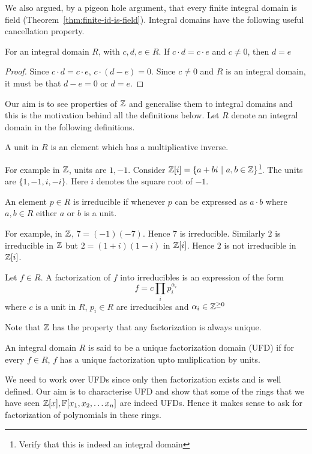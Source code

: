 We also argued, by a pigeon hole argument, that every finite integral domain is
field (Theorem~\ref{thm:finite-id-is-field}). Integral domains have the
following useful cancellation property.  
\begin{lemma} \label{lem:id-cancel}
	For an integral domain $R$, with $c,d,e \in R$. If 
	$c\cdot d = c\cdot e$ and $c \ne 0$, then $d=e$
\end{lemma}
\begin{proof}
	Since $c\cdot d = c \cdot e$, $c\cdot (d-e) = 0$. Since $c \ne 0$ and $R$ is
	an integral domain, it must be that $d-e = 0$ or $d=e$.
\end{proof}

Our aim is to see properties of ${\mathbb{Z}}$ and generalise them
to integral domains and this is the motivation behind all the definitions
below. Let $R$ denote an integral domain in the following
definitions.
\begin{definition}[Unit]
	A unit in $R$ is an element which has a multiplicative inverse.
\end{definition}
For example in ${\mathbb{Z}}$, units are $1,-1$. Consider ${\mathbb{Z}}[i] = \{a + bi ~|~ a,b \in
{\mathbb{Z}} \}$\footnote{Verify that this is indeed an integral domain}.  The units are
$\{1,-1,i,-i\}$. Here $i$ denotes the square root of $-1$.
\begin{definition}[Irreducible]
	An element $p \in R$ is irreducible if whenever $p$ can be expressed
	as $a \cdot b$ where $a,b \in R$ either $a$ or $b$ is a unit.
\end{definition}
For example, in ${\mathbb{Z}}$, $7 = (-1)(-7)$. Hence $7$ is irreducible. Similarly $2$
is irreducible in ${\mathbb{Z}}$ but $2 = (1+i)(1-i)$ in ${\mathbb{Z}}[i]$. Hence $2$ is not
irreducible in ${\mathbb{Z}}[i]$.

\begin{definition}[Factorization]
	Let $f \in R$. A factorization of $f$ into irreducibles is an
	expression of the form \[ f = c\prod_i p_i^{\alpha_i}\] where $c$ is a
	unit in $R$, $p_i \in R$ are irreducibles and $\alpha_i \in {\mathbb{Z}}^{\ge
	0}$
\end{definition}

Note that ${\mathbb{Z}}$ has the property that any factorization is always unique.
\begin{definition}
	An integral domain $R$ is said to be a unique factorization domain
	(UFD) if for every $f \in R$, $f$ has a unique factorization upto
	muliplication by units.
\end{definition}
We need to work over UFDs since only then factorization exists and is well
defined.  Our aim is to characterise UFD and show that some of the rings that
we have seen ${\mathbb{Z}}[x], {\mathbb{F}[x_1,x_2, \ldots x_n]}$ are indeed UFDs. Hence it makes sense to ask
for factorization of polynomials in these rings.

